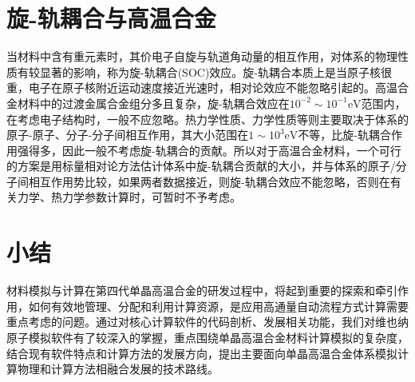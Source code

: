 \section{旋-轨耦合与高温合金}
当材料中含有重元素时，其价电子自旋与轨道角动量的相互作用，对体系的物理性质有较显著的影响，称为旋-轨耦合\textrm{(SOC)}效应。旋-轨耦合本质上是当原子核很重，电子在原子核附近运动速度接近光速时，相对论效应不能忽略引起的。高温合金材料中的过渡金属合金组分多且复杂，旋-轨耦合效应在$10^{-2}\sim10^{-1}\mathrm{eV}$范围内，在考虑电子结构时，一般不应忽略。热力学性质、力学性质等则主要取决于体系的原子-原子、分子-分子间相互作用，其大小范围在$1\sim10^3\mathrm{eV}$不等，比旋-轨耦合作用强得多，因此一般不考虑旋-轨耦合的贡献。所以对于高温合金材料，一个可行的方案是用标量相对论方法估计体系中旋-轨耦合贡献的大小，并与体系的原子/分子间相互作用势比较，如果两者数据接近，则旋-轨耦合效应不能忽略，否则在有关力学、热力学参数计算时，可暂时不予考虑。

\section{小结}
材料模拟与计算在第四代单晶高温合金的研发过程中，将起到重要的探索和牵引作用，如何有效地管理、分配和利用计算资源，是应用高通量自动流程方式计算需要重点考虑的问题。通过对核心计算软件的代码剖析、发展相关功能，我们对维也纳原子模拟软件有了较深入的掌握，重点围绕单晶高温合金材料计算模拟的复杂度，结合现有软件特点和计算方法的发展方向，提出主要面向单晶高温合金体系模拟计算物理和计算方法相融合发展的技术路线。

